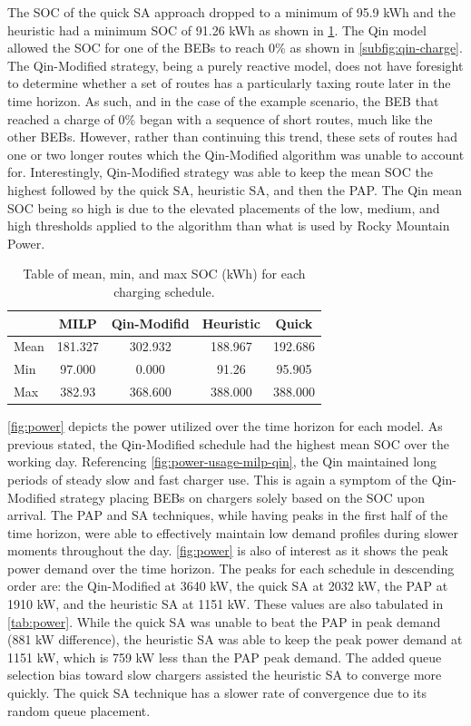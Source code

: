 \documentclass[energies,article,submit,moreauthors]{Definitions/mdpi}
\begin{document}
The SOC of the quick SA approach dropped to a minimum of 95.9 kWh and the heuristic had a minimum SOC of 91.26 kWh as
shown in \ref{tab:charge}. The Qin model allowed the SOC for one of the BEBs to reach 0\% as shown in \ref{subfig:qin-charge}.
The Qin-Modified strategy, being a purely reactive model, does not have foresight to determine whether a set of routes
has a particularly taxing route later in the time horizon. As such, and in the case of the example scenario, the BEB
that reached a charge of 0\% began with a sequence of short routes, much like the other BEBs. However, rather than
continuing this trend, these sets of routes had one or two longer routes which the Qin-Modified algorithm was unable to
account for. Interestingly, Qin-Modified strategy was able to keep the mean SOC the highest followed by the quick SA,
heuristic SA, and then the PAP. The Qin mean SOC being so high is due to the elevated placements of the low, medium, and
high thresholds applied to the algorithm than what is used by Rocky Mountain Power.

\begin{table}[htbp]
\caption{\label{tab:charge}Table of mean, min, and max SOC (kWh) for each charging schedule.}
\centering
\begin{tabular}{l|cccc}
\hline
 & MILP & Qin-Modifid & Heuristic & Quick\\[0pt]
\hline
Mean & 181.327 & 302.932 & 188.967 & 192.686\\[0pt]
Min & 97.000 & 0.000 & 91.26 & 95.905\\[0pt]
Max & 382.93 & 368.600 & 388.000 & 388.000\\[0pt]
\hline
\end{tabular}
\end{table}

\ref{fig:power} depicts the power utilized over the time horizon for each model. As previous stated, the Qin-Modified
schedule had the highest mean SOC over the working day. Referencing \ref{fig:power-usage-milp-qin}, the Qin maintained
long periods of steady slow and fast charger use. This is again a symptom of the Qin-Modified strategy placing BEBs on
chargers solely based on the SOC upon arrival. The PAP and SA techniques, while having peaks in the first half of the
time horizon, were able to effectively maintain low demand profiles during slower moments throughout the day.
\ref{fig:power} is also of interest as it shows the peak power demand over the time horizon. The peaks for each schedule
in descending order are: the Qin-Modified at 3640 kW, the quick SA at 2032 kW, the PAP at 1910 kW, and the heuristic SA
at 1151 kW. These values are also tabulated in \ref{tab:power}. While the quick SA was unable to beat the PAP in peak
demand (881 kW difference), the heuristic SA was able to keep the peak power demand at 1151 kW, which is 759 kW less
than the PAP peak demand. The added queue selection bias toward slow chargers assisted the heuristic SA to converge more
quickly. The quick SA technique has a slower rate of convergence due to its random queue placement.
\end{document}
